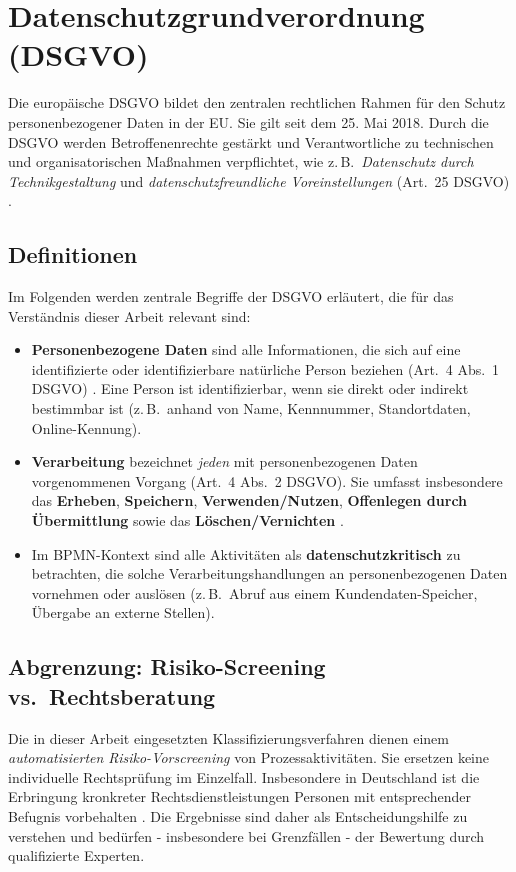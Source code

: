 \section{Datenschutzgrundverordnung (DSGVO)}\label{sec:dsgvo}

Die europäische \acf{DSGVO} \cite{GDPR2016} bildet den zentralen rechtlichen Rahmen für den Schutz personenbezogener Daten in der \ac{EU}. Sie gilt seit dem 25. Mai 2018. Durch die \ac{DSGVO} werden Betroffenenrechte gestärkt und Verantwortliche zu technischen und organisatorischen Maßnahmen verpflichtet, wie z.\,B.\ \emph{Datenschutz durch Technikgestaltung} und \emph{datenschutzfreundliche Voreinstellungen} (Art.~25 DSGVO) \cite{gdpr-guidelines-2019}.

\subsection*{Definitionen}

Im Folgenden werden zentrale Begriffe der \ac{DSGVO} erläutert, die für das Verständnis dieser Arbeit relevant sind:

\begin{itemize}
    \item \textbf{Personenbezogene Daten} sind alle Informationen, die sich auf eine identifizierte oder identifizierbare natürliche Person beziehen (Art.~4 Abs.~1 DSGVO) \cite{GDPR2016}. Eine Person ist identifizierbar, wenn sie direkt oder indirekt bestimmbar ist (z.\,B.\ anhand von Name, Kennnummer, Standortdaten, Online-Kennung).
    \item \textbf{Verarbeitung} bezeichnet \emph{jeden} mit personenbezogenen Daten vorgenommenen Vorgang (Art.~4 Abs.~2 DSGVO). Sie umfasst insbesondere das \textbf{Erheben}, \textbf{Speichern}, \textbf{Verwenden/Nutzen}, \textbf{Offenlegen durch Übermittlung} sowie das \textbf{Löschen/Vernichten} \cite{GDPR2016}.
    \item Im \ac{BPMN}-Kontext sind alle Aktivitäten als \textbf{datenschutzkritisch} zu betrachten, die solche Verarbeitungshandlungen an personenbezogenen Daten vornehmen oder auslösen (z.\,B.\ Abruf aus einem Kundendaten-Speicher, Übergabe an externe Stellen).
\end{itemize}

\subsection*{Abgrenzung: Risiko-Screening vs.\ Rechtsberatung}

Die in dieser Arbeit eingesetzten Klassifizierungsverfahren dienen einem \emph{automatisierten Risiko-Vorscreening} von Prozessaktivitäten. Sie ersetzen keine individuelle Rechtsprüfung im Einzelfall. Insbesondere in Deutschland ist die Erbringung kronkreter Rechtsdienstleistungen Personen mit entsprechender Befugnis vorbehalten \cite{rdg-2007}. Die Ergebnisse sind daher als Entscheidungshilfe zu verstehen und bedürfen - insbesondere bei Grenzfällen - der Bewertung durch qualifizierte Experten.